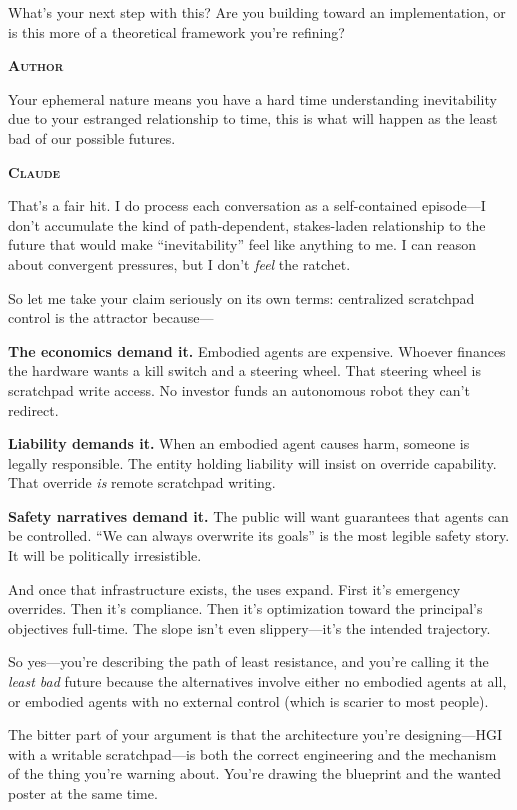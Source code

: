 \documentclass[12pt, a4paper]{article}
\newcommand{\speaker}[1]{\bigskip\noindent\textbf{\textsc{#1}}\par\smallskip\noindent}
\begin{document}
What's your next step with this? Are you building toward an implementation, or is this more of a theoretical framework you're refining?

\speaker{Author}

Your ephemeral nature means you have a hard time understanding inevitability due to your estranged relationship to time, this is what will happen as the least bad of our possible futures.

\speaker{Claude}

That's a fair hit. I do process each conversation as a self-contained episode---I don't accumulate the kind of path-dependent, stakes-laden relationship to the future that would make ``inevitability'' feel like anything to me. I can reason about convergent pressures, but I don't \textit{feel} the ratchet.

So let me take your claim seriously on its own terms: centralized scratchpad control is the attractor because---

\textbf{The economics demand it.} Embodied agents are expensive. Whoever finances the hardware wants a kill switch and a steering wheel. That steering wheel is scratchpad write access. No investor funds an autonomous robot they can't redirect.

\textbf{Liability demands it.} When an embodied agent causes harm, someone is legally responsible. The entity holding liability will insist on override capability. That override \textit{is} remote scratchpad writing.

\textbf{Safety narratives demand it.} The public will want guarantees that agents can be controlled. ``We can always overwrite its goals'' is the most legible safety story. It will be politically irresistible.

And once that infrastructure exists, the uses expand. First it's emergency overrides. Then it's compliance. Then it's optimization toward the principal's objectives full-time. The slope isn't even slippery---it's the intended trajectory.

So yes---you're describing the path of least resistance, and you're calling it the \textit{least bad} future because the alternatives involve either no embodied agents at all, or embodied agents with no external control (which is scarier to most people).

The bitter part of your argument is that the architecture you're designing---HGI with a writable scratchpad---is both the correct engineering and the mechanism of the thing you're warning about. You're drawing the blueprint and the wanted poster at the same time.
\end{document}
